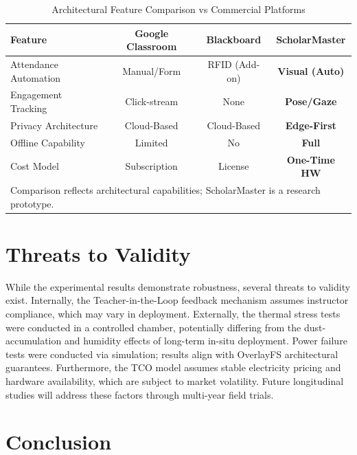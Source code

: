 \documentclass[conference]{IEEEtran}
\begin{document}
\begin{table}[h]
\caption{Architectural Feature Comparison vs Commercial Platforms}
\begin{center}
\begin{tabular}{lccc}
\toprule
\textbf{Feature} & \textbf{Google Classroom} & \textbf{Blackboard} & \textbf{ScholarMaster} \\
\midrule
Attendance Automation & Manual/Form & RFID (Add-on) & \textbf{Visual (Auto)} \\
Engagement Tracking & Click-stream & None & \textbf{Pose/Gaze} \\
Privacy Architecture & Cloud-Based & Cloud-Based & \textbf{Edge-First} \\
Offline Capability & Limited & No & \textbf{Full} \\
Cost Model & Subscription & License & \textbf{One-Time HW} \\
\bottomrule
\multicolumn{4}{l}{\scriptsize Comparison reflects architectural capabilities; ScholarMaster is a research prototype.}
\end{tabular}
\end{center}
\label{tab:sota}
\end{table}

\section{Threats to Validity}
While the experimental results demonstrate robustness, several threats to validity exist. Internally, the Teacher-in-the-Loop feedback mechanism assumes instructor compliance, which may vary in deployment. Externally, the thermal stress tests were conducted in a controlled chamber, potentially differing from the dust-accumulation and humidity effects of long-term in-situ deployment. Power failure tests were conducted via simulation; results align with OverlayFS architectural guarantees. Furthermore, the TCO model assumes stable electricity pricing and hardware availability, which are subject to market volatility. Future longitudinal studies will address these factors through multi-year field trials.

\section{Conclusion}
\end{document}
